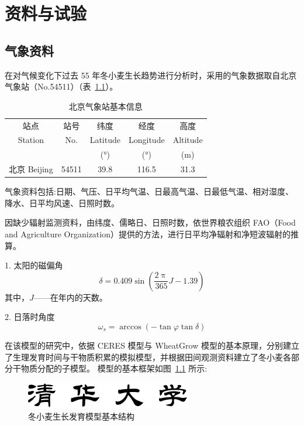 \documentclass[degree=bachelor]{thuthesis}
\begin{document}
\chapter{资料与试验}

\section{气象资料}

在对气候变化下过去 55 年冬小麦生长趋势进行分析时，采用的气象数据取自北京气象站（No.54511）（表~\ref{tab:beijing}）。

\begin{table}[htb]
  \centering
  \caption{北京气象站基本信息}
  \label{tab:beijing}
  \begin{tabular}{ccccc}
    \toprule
    站点 & 站号 & 纬度 & 经度 & 高度 \\
    Station & No. & Latitude & Longitude & Altitude \\
    && (°) & (°) & (m) \\
    \midrule
    北京 Beijing & 54511 & 39.8 & 116.5 & 31.3 \\
    \bottomrule
  \end{tabular}
\end{table}

气象资料包括:日期、气压、日平均气温、日最高气温、日最低气温、相对湿度、降水、日平均风速、日照时数。

因缺少辐射监测资料，由纬度、儒略日、日照时数，依世界粮农组织 FAO（Food and Agriculture Organization）提供的方法，进行日平均净辐射和净短波辐射的推算。

1. 太阳的磁偏角
\begin{equation}
  \delta = 0.409 \sin \left( \frac{2\uppi}{365} J - 1.39 \right)
\end{equation}
其中，$J$——在年内的天数。

2. 日落时角度
\begin{equation}
  \omega_s =\arccos\left( -\tan\varphi \tan\delta \right)
\end{equation}

\newpage

在该模型的研究中，依据 CERES 模型与 WheatGrow 模型的基本原理，分别建立了生理发育时间与干物质积累的模拟模型，并根据田间观测资料建立了冬小麦各部分干物质分配的子模型。
模型的基本框架如图~\ref{fig:winter} 所示:

\begin{figure}[htb]
  \centering
  \includegraphics{tsinghua.pdf}
  \caption{冬小麦生长发育模型基本结构}
  \label{fig:winter}
\end{figure}
\end{document}
